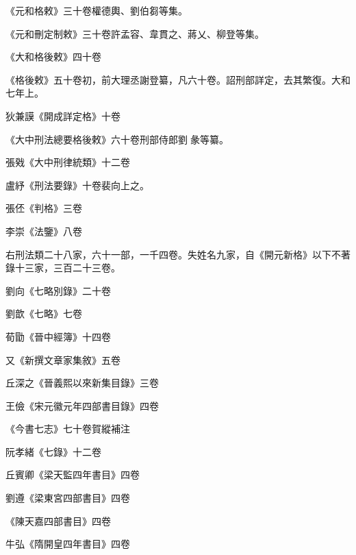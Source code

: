 \begin{pinyinscope}
 《元和格敕》三十卷權德輿、劉伯芻等集。



 《元和刪定制敕》三十卷許孟容、韋貫之、蔣乂、柳登等集。



 《大和格後敕》四十卷



 《格後敕》五十卷初，前大理丞謝登纂，凡六十卷。詔刑部詳定，去其繁復。大和七年上。



 狄兼謨《開成詳定格》十卷



 《大中刑法總要格後敕》六十卷刑部侍郎劉彖等纂。



 張戣《大中刑律統類》十二卷



 盧紓《刑法要錄》十卷裴向上之。



 張伾《判格》三卷



 李崇《法鑒》八卷



 右刑法類二十八家，六十一部，一千四卷。失姓名九家，自《開元新格》以下不著錄十三家，三百二十三卷。



 劉向《七略別錄》二十卷



 劉歆《七略》七卷



 荀勖《晉中經簿》十四卷



 又《新撰文章家集敘》五卷



 丘深之《晉義熙以來新集目錄》三卷



 王儉《宋元徽元年四部書目錄》四卷



 《今書七志》七十卷賀縱補注



 阮孝緒《七錄》十二卷



 丘賓卿《梁天監四年書目》四卷



 劉遵《梁東宮四部書目》四卷



 《陳天嘉四部書目》四卷



 牛弘《隋開皇四年書目》四卷




\end{pinyinscope}

